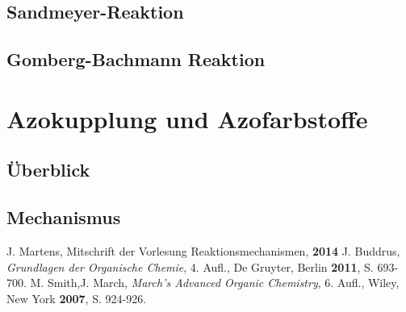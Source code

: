 \documentclass[12pt]{beamer}
\begin{document}
\subsection{Sandmeyer-Reaktion}


\subsection{Gomberg-Bachmann Reaktion}



\section{Azokupplung und Azofarbstoffe}
\subsection{Überblick}

\subsection{Mechanismus}

\begin{frame}
\begin{thebibliography}{}
J. Martens, Mitschrift der Vorlesung Reaktionsmechanismen, \textbf{2014}
J. Buddrus, \textit{Grundlagen der Organische Chemie}, 4. Aufl., De Gruyter, Berlin \textbf{2011}, S. 693-700.
M. Smith,J. March, \textit{March's Advanced Organic Chemistry}, 6. Aufl., Wiley, New York \textbf{2007}, S. 924-926.
\end{thebibliography}
\end{frame}



%


\end{document}
